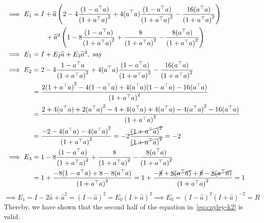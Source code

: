 \begin{align*}
    \implies
    E_1
     & =
    I
    + \widehat{a} \left( 2 - 4 \frac{(1 - a^{\top} a)}{{(1 + a^{\top} a)}^{2}} + 4 (a^{\top} a) \frac{(1 - a^{\top} a)}{{(1 + a^{\top} a)}^{2}} - \frac{16 (a^{\top} a)}{{(1 + a^{\top} a)}^{2}} \right)
    \\ & \qquad
    + \widehat{a}^{2} \left( 1 - 8 \frac{(1 - a^{\top} a)}{{(1 + a^{\top} a)}^{2}} + \frac{8}{{(1 + a^{\top} a)}^{2}} - \frac{8(a^{\top} a)}{{(1 + a^{\top} a)}^{2}} \right)
    \\
    \implies
    E_1
     & =
    I
    + E_2 \widehat{a}
    + E_3 \widehat{a}^{2},
    \text{ say}
    \\
    \implies
    E_2
     & =
    2 - 4 \frac{1 - a^{\top} a}{{(1 + a^{\top} a)}^{2}} + 4 (a^{\top} a) \frac{(1 - a^{\top} a)}{{(1 + a^{\top} a)}^{2}} - \frac{16 (a^{\top} a)}{{(1 + a^{\top} a)}^{2}}
    \\ & =
    \frac{
        2 {(1 + a^{\top} a)}^{2} - 4 (1 - a^{\top} a) + 4 (a^{\top} a) (1 - a^{\top} a) - 16 (a^{\top} a)
    }{{(1 + a^{\top} a)}^{2}}
    \\ & =
    \frac{
        2 + 4 (a^{\top} a) + 2 {(a^{\top} a)}^{2} - 4 + 4 (a^{\top} a) + 4 (a^{\top} a) - 4 {(a^{\top} a)}^{2} - 16 (a^{\top} a)
    }{{(1 + a^{\top} a)}^{2}}
    \\ & =
    \frac{
        -2 - 4 (a^{\top} a) - 4 {(a^{\top} a)}^{2}
    }{{(1 + a^{\top} a)}^{2}}
    =
    -2 \frac{\cancel{{(1 + a^{\top} a)}^{2}}}{\cancel{{(1 + a^{\top} a)}^{2}}}
    =
    -2
    \\
    \implies
    E_3
     & =
    1 - 8 \frac{(1 - a^{\top} a)}{{(1 + a^{\top} a)}^{2}} + \frac{8}{{(1 + a^{\top} a)}^{2}} - \frac{8(a^{\top} a)}{{(1 + a^{\top} a)}^{2}}
    \\ & =
    1 +
    \frac{
        - 8 (1 - a^{\top} a) + 8 - 8 (a^{\top} a)
    }{{(1 + a^{\top} a)}^{2}}
    =
    1 +
    \frac{
        - \cancel{8} + \cancel{8 (a^{\top} a)} + \cancel{8} - \cancel{8 (a^{\top} a)}
    }{{(1 + a^{\top} a)}^{2}}
    =
    1
\end{align*}
\begin{equation*}
    \implies
    E_1
    =
    I - 2 \widehat{a} + \widehat{a}^{2}
    =
    {(I - \widehat{a})}^{2}
    =
    E_0
    {(I + \widehat{a})}^{2}
    \implies
    E_0
    =
    {(I - \widehat{a})}^{2} {(I + \widehat{a})}^{-2}
    =
    R
\end{equation*}
Thereby, we have shown that the second half of the equation in~\eqref{eq:cayley-k2} is valid.

